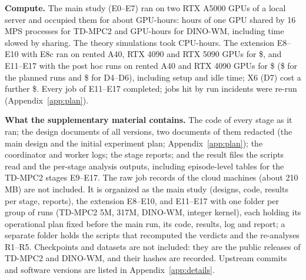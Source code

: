 \textbf{Compute.} The main study (E0--E7) ran on two RTX A5000 GPUs of a local server and occupied them for about  GPU-hours:  hours of one GPU shared by 16 MPS processes for TD-MPC2 and  GPU-hours for DINO-WM, including time slowed by sharing. The theory simulations took  CPU-hours. The extension E8--E10 with E8c ran on rented A40, RTX 4090 and RTX 5090 GPUs for \$, and E11--E17 with the post hoc runs on rented A40 and RTX 4090 GPUs for \$ (\$ for the planned runs and \$ for D4--D6), including setup and idle time; X6 (D7) cost a further \$. Every job of E11--E17 completed; jobs hit by run incidents were re-run (Appendix~\ref{app:plan}).

\textbf{What the supplementary material contains.} The code of every stage as it ran; the design documents of all versions, two documents of them redacted (the main design and the initial experiment plan; Appendix~\ref{app:plan}); the coordinator and worker logs; the stage reports; and the result files the scripts read and the per-stage analysis outputs, including episode-level tables for the TD-MPC2 stages E9--E17. The raw job records of the cloud machines (about 210 MB) are not included. It is organized as the main study (designs, code, results per stage, reports), the extension E8--E10, and E11--E17 with one folder per group of runs (TD-MPC2 5M, 317M, DINO-WM, integer kernel), each holding its operational plan fixed before the main run, its code, results, log and report; a separate folder holds the scripts that recomputed the verdicts and the re-analyses R1--R5. Checkpoints and datasets are not included: they are the public releases of TD-MPC2 and DINO-WM, and their hashes are recorded. Upstream commits and software versions are listed in Appendix~\ref{app:details}.

